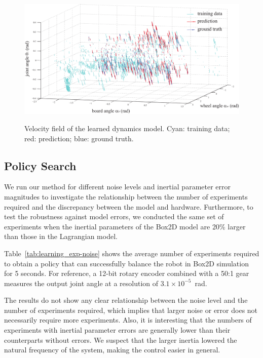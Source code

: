 \begin{figure}[tb]
\begin{center}
\includegraphics[width=120mm]{eps/field_00003_l03.pdf}\\
\caption{Velocity field of the learned dynamics model. Cyan: training
 data; red: prediction; blue: ground truth.}
\label{fig:learning_vector3d}
\end{center}
\end{figure}

\subsection{Policy Search}



We run our method for different noise levels and inertial parameter
error magnitudes to investigate the relationship between the number of
experiments required and the discrepancy between the model and hardware.
Furthermore, to test the robustness against model errors, we conducted
the same set of experiments when the inertial parameters of the Box2D
model are 20\% larger than those in the Lagrangian model.

Table~\ref{tab:learning_exp-noise} shows the average number of experiments
required to obtain a policy that can successfully balance the robot
in Box2D simulation for 5 seconds.
For reference, a 12-bit rotary encoder combined with a 50:1 gear
measures the output joint angle at a resolution of $3.1\times 10^{-5}$~rad.

The results do not show any clear relationship between the noise level
and the number of experiments required, which
implies that larger noise or error does not necessarily require more
experiments. 
Also, it is interesting that the numbers of experiments with inertial
parameter errors are generally lower than their counterparts without
errors.
We suspect that the larger inertia lowered the natural frequency of the
system, making the control easier in general.


